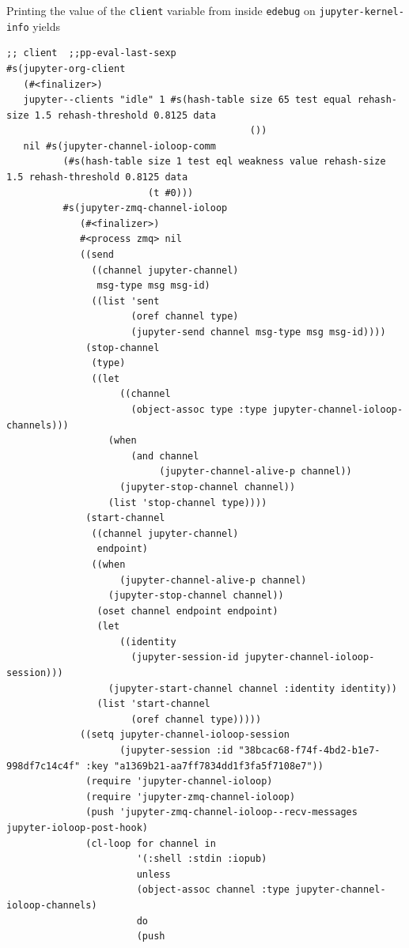 \documentclass[11pt]{article}
\begin{document}
\begin{enumerate}
\begin{verbatim}
\end{verbatim}

Printing the value of the \texttt{client} variable from inside \texttt{edebug} on \texttt{jupyter-kernel-info} yields

\begin{verbatim}
;; client  ;;pp-eval-last-sexp
#s(jupyter-org-client
   (#<finalizer>)
   jupyter--clients "idle" 1 #s(hash-table size 65 test equal rehash-size 1.5 rehash-threshold 0.8125 data
                                           ())
   nil #s(jupyter-channel-ioloop-comm
          (#s(hash-table size 1 test eql weakness value rehash-size 1.5 rehash-threshold 0.8125 data
                         (t #0)))
          #s(jupyter-zmq-channel-ioloop
             (#<finalizer>)
             #<process zmq> nil
             ((send
               ((channel jupyter-channel)
                msg-type msg msg-id)
               ((list 'sent
                      (oref channel type)
                      (jupyter-send channel msg-type msg msg-id))))
              (stop-channel
               (type)
               ((let
                    ((channel
                      (object-assoc type :type jupyter-channel-ioloop-channels)))
                  (when
                      (and channel
                           (jupyter-channel-alive-p channel))
                    (jupyter-stop-channel channel))
                  (list 'stop-channel type))))
              (start-channel
               ((channel jupyter-channel)
                endpoint)
               ((when
                    (jupyter-channel-alive-p channel)
                  (jupyter-stop-channel channel))
                (oset channel endpoint endpoint)
                (let
                    ((identity
                      (jupyter-session-id jupyter-channel-ioloop-session)))
                  (jupyter-start-channel channel :identity identity))
                (list 'start-channel
                      (oref channel type)))))
             ((setq jupyter-channel-ioloop-session
                    (jupyter-session :id "38bcac68-f74f-4bd2-b1e7-998df7c14c4f" :key "a1369b21-aa7ff7834dd1f3fa5f7108e7"))
              (require 'jupyter-channel-ioloop)
              (require 'jupyter-zmq-channel-ioloop)
              (push 'jupyter-zmq-channel-ioloop--recv-messages jupyter-ioloop-post-hook)
              (cl-loop for channel in
                       '(:shell :stdin :iopub)
                       unless
                       (object-assoc channel :type jupyter-channel-ioloop-channels)
                       do
                       (push

\end{verbatim}
\end{enumerate}
\end{document}
